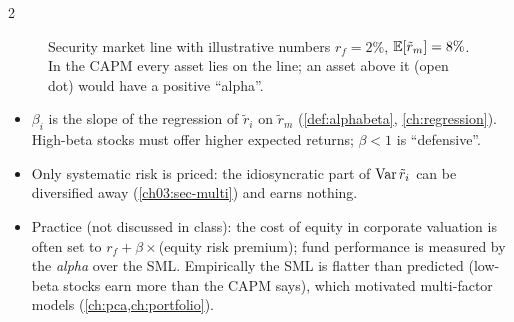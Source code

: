 \begin{paracol}{2}
\begin{figure}[ht]
\centering
{}
\caption{Security market line with illustrative numbers $r_f=2\%$, $\mathbb{E}[\tilde r_m]=8\%$. In the CAPM every asset lies
on the line; an asset above it (open dot) would have a positive ``alpha''.}\label{ch03:fig-sml}
\end{figure}

\begin{finance}
\begin{itemize}
  \item $\beta_i$ is the slope of the regression of $\tilde r_i$ on $\tilde r_m$  (\cref{def:alphabeta},
        \cref{ch:regression}). High-beta stocks must offer higher expected returns; $\beta<1$ is ``defensive''.
  \item Only systematic risk is priced: the idiosyncratic part of $\operatorname{Var}\tilde r_i$ can be diversified away
        (\cref{ch03:sec-multi}) and earns nothing.
  \item Practice (not discussed in class): the cost of equity in corporate valuation is often set to
        $r_f+\beta\times$(equity risk premium); fund performance is measured by the \emph{alpha} over the SML.
        Empirically the SML is flatter than predicted (low-beta stocks earn more than the CAPM says), which
        motivated multi-factor models (\cref{ch:pca,ch:portfolio}).
\end{itemize}
\end{finance}


\end{paracol}
